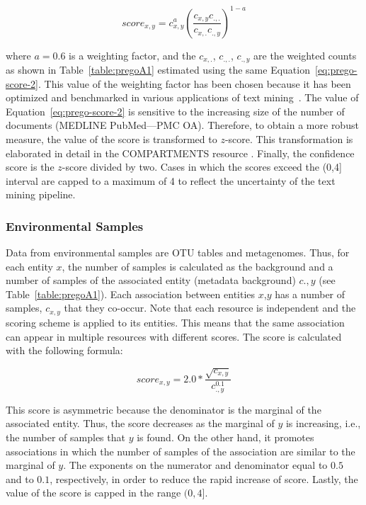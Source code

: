 \begin{equation}
   score_{x,y} = c_{x,y}^a (\frac{c_{x,y} c_{.,.}}{c_{x, .}c_{.,y}})^{1-a}
   \label{eq:prego-score-2}
\end{equation}
   


where $a = 0.6$ is a weighting factor, and the $c_{x,.}$, $c_{.,.}$, 
$c_{.,y}$ are the weighted counts as shown in Table~\ref{table:pregoA1} estimated using the same Equation~\ref{eq:prego-score-2}. 
This value of the weighting factor has been chosen because it has been optimized and benchmarked in various 
applications of text mining~\parencite{franceschini2012string, binder2014compartments, pletscher2015diseases}. 
The value of Equation~\ref{eq:prego-score-2} is sensitive to the increasing size of the number of documents (MEDLINE PubMed—PMC OA).
Therefore, to obtain a more robust measure, the value of the score is transformed to $z$-score. 
This transformation is elaborated in detail in the COMPARTMENTS resource \parencite{binder2014compartments}. 
Finally, the confidence score is the $z$-score divided by two. Cases in which the scores exceed the (0,4] interval are capped to a maximum of 4 to reflect the uncertainty of the text mining pipeline.

\subsubsection{Environmental Samples}

Data from environmental samples are OTU tables and metagenomes. 
Thus, for each entity $x$, the number of samples is calculated as the background 
and a number of samples of the associated entity (metadata background) $c.,y$ (see Table~\ref{table:pregoA1}). 
Each association between entities $x$,$y$ has a number of samples, $c_{x,y}$ that they co-occur. 
Note that each resource is independent and the scoring scheme is applied to its entities. 
This means that the same association can appear in multiple resources with different scores. 
The score is calculated with the following formula:

\begin{equation}
   score_{x,y} = 2.0*{\frac{\sqrt{c_{x,y}}}{c_{.,y}^{0.1}}}
\end{equation}


This score is asymmetric because the denominator is the marginal of the associated entity. 
Thus, the score decreases as the marginal of $y$ is increasing, i.e., the number of samples that $y$ is found. 
On the other hand, it promotes associations in which the number of samples of 
the association are similar to the marginal of $y$. 
The exponents on the numerator and denominator equal to $0.5$ and 
to $0.1$, respectively, in order to reduce the rapid increase of score.
Lastly, the value of the score is capped in the range $(0,4]$.


